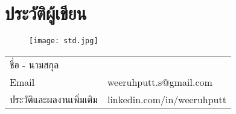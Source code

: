 \chapter{ประวัติผู้เขียน}

 \begin{figure}[h]
	\centering
	\texttt{[image: std.jpg]}
	\label{Fig:std.jpg}
\end{figure}

\begin{center}

\begin{tabular}{l l}
	ชื่อ - นามสกุล & \AuName \\
	Email & weeruhputt.s@gmail.com \\
	ประวัติและผลงานเพิ่มเติม & linkedin.com/in/weeruhputt \\
\end{tabular}

\end{center}
